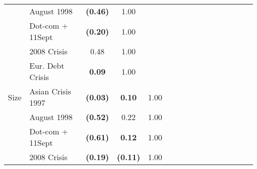\documentclass[12pt]{article}
\begin{document}
\begin{table}[H]
{\begin{tabular}{@{}llcccccccccccccc@{}}
                  & August 1998       & \textbf{(0.46)} & 1.00            &                 &                 &                 &                 &                 &                 &                 &                 &                 &                 &                 &                 \\
                  & Dot-com + 11Sept  & \textbf{(0.20)} & 1.00            &                 &                 &                 &                 &                 &                 &                 &                 &                 &                 &                 &                 \\
                  & 2008 Crisis       & 0.48            & 1.00            &                 &                 &                 &                 &                 &                 &                 &                 &                 &                 &                 &                 \\
                  & Eur. Debt Crisis  & \textbf{0.09}   & 1.00            &                 &                 &                 &                 &                 &                 &                 &                 &                 &                 &                 &                 \\
Size              & Asian Crisis 1997 & \textbf{(0.03)} & \textbf{0.10}   & 1.00            & \textbf{}       & \textbf{}       & \textbf{}       & \textbf{}       & \textbf{}       &                 &                 &                 &                 &                 &                 \\
                  & August 1998       & \textbf{(0.52)} & 0.22            & 1.00            &                 &                 &                 &                 &                 &                 &                 &                 &                 &                 &                 \\
                  & Dot-com + 11Sept  & \textbf{(0.61)} & \textbf{0.12}   & 1.00            &                 &                 &                 &                 &                 &                 &                 &                 &                 &                 &                 \\
                  & 2008 Crisis       & \textbf{(0.19)} & \textbf{(0.11)} & 1.00            &                 &                 &                 &                 &                 &                 &                 &                 &                 &                 &                 \\

\end{tabular}}
\end{table}
\end{document}
